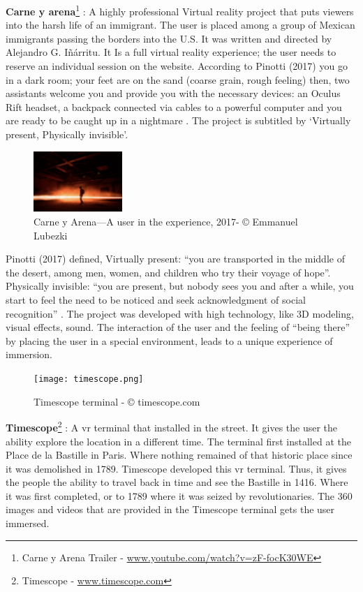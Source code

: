 \textbf{Carne y arena}\footnote{Carne y Arena Trailer - \url{www.youtube.com/watch?v=zF-focK30WE}} : A highly professional
Virtual reality project that puts viewers
into the harsh life of an immigrant. The
user is placed among a group of
Mexican immigrants passing the
borders into the U.S. It was written and
directed by Alejandro G. Iñárritu. It Is a
full virtual reality experience; the user
needs to reserve an individual session
on the website. According to Pinotti (2017) you go in a dark room; your feet are on the sand (coarse grain, rough feeling) then, two assistants welcome you and provide you with the
necessary devices: an Oculus Rift headset, a backpack connected via cables to a powerful
computer and you are ready to be caught up in a nightmare \citep{Pinotti2017}. The project is
subtitled by ‘Virtually present, Physically invisible’. 

\begin{figure}
    \centering
    \includegraphics[width=0.30\textwidth]{images/carne.png}
    \caption{Carne y Arena—A user in the experience, 2017- © Emmanuel Lubezki}
    \label{fig:carne}
\end{figure}

Pinotti (2017) defined, Virtually present:
“you are transported in the middle of the desert, among men, women, and children who try
their voyage of hope”. Physically invisible: “you are present, but nobody sees you and after a
while, you start to feel the need to be noticed and seek acknowledgment of social
recognition” \citep{Pinotti2017}. The project was developed with high technology, like 3D
modeling, visual effects, sound. The interaction of the user and the feeling of “being there”
by placing the user in a special environment, leads to a unique experience of immersion.


\begin{figure}
    \centering
    \texttt{[image: timescope.png]}
    \caption{Timescope terminal - © timescope.com }
    \label{fig:timescope}
\end{figure}
\textbf{Timescope}\footnote{Timescope - \url{www.timescope.com}} : A \acrshort{vr} terminal that installed in the street. It gives the user the ability explore the location in a different time. The terminal first installed at the Place de la Bastille in Paris. Where nothing remained of that historic place since it was demolished in 1789. Timescope developed this \acrshort{vr} terminal. Thus, it gives the people the ability to travel back in time and see the Bastille in 1416. Where it was first completed, or to 1789 where it was seized by revolutionaries. The 360 images and videos that are provided in the Timescope terminal gets the user immersed.

